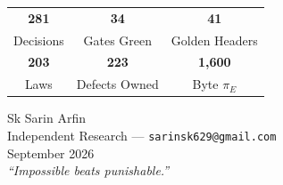 \documentclass[11pt, a4paper]{article}
\theoremstyle{plain}
\theoremstyle{definition}
\theoremstyle{remark}
\begin{document}
\begin{titlepage}
\begin{center}
\vspace{1cm}

\begin{tabular}{ccc}
\textcolor{hsmaBlue}{\textbf{281}} & \textcolor{hsmaTeal}{\textbf{34}} & \textcolor{hsmaGreen}{\textbf{41}} \\
{\small Decisions} & {\small Gates Green} & {\small Golden Headers} \\[6pt]
\textcolor{hsmaGold}{\textbf{203}} & \textcolor{hsmaPurple}{\textbf{223}} & \textcolor{hsmaRed}{\textbf{1,600}} \\
{\small Laws} & {\small Defects Owned} & {\small Byte $\pi_E$} \\
\end{tabular}

\vfill
{\large Sk Sarin Arfin}\\[0.3em]
{\small Independent Research --- \texttt{sarinsk629@gmail.com}}\\[0.5em]
{\small September 2026}\\[1em]
{\small\itshape ``Impossible beats punishable.''}
\end{center}
\end{titlepage}
\end{document}
